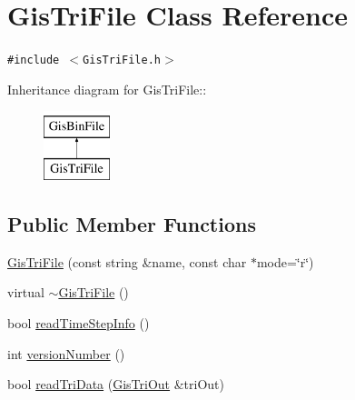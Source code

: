 \hypertarget{classGisTriFile}{
\section{Gis\-Tri\-File Class Reference}
\label{classGisTriFile}
}
{\tt \#include $<$Gis\-Tri\-File.h$>$}

Inheritance diagram for Gis\-Tri\-File::\begin{figure}[H]
\begin{center}
\leavevmode
\includegraphics[height=2cm]{classGisTriFile}
\end{center}
\end{figure}
\subsection*{Public Member Functions}
\begin{CompactItemize}
\item 
\hyperlink{classGisTriFile_a0}{Gis\-Tri\-File} (const string \&name, const char $\ast$mode=\char`\"{}r\char`\"{})
\item 
virtual \hyperlink{classGisTriFile_a1}{$\sim$Gis\-Tri\-File} ()
\item 
bool \hyperlink{classGisTriFile_a2}{read\-Time\-Step\-Info} ()
\item 
int \hyperlink{classGisTriFile_a3}{version\-Number} ()
\item 
bool \hyperlink{classGisTriFile_a4}{read\-Tri\-Data} (\hyperlink{classGisTriOut}{Gis\-Tri\-Out} \&tri\-Out)
\end{CompactItemize}
